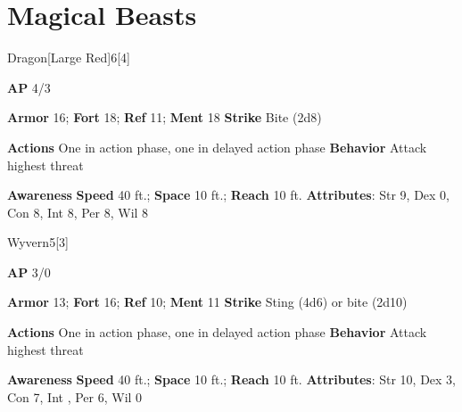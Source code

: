 \section{Magical Beasts}
\begin{monsection}{Dragon}[Large Red]{6}[4]
\vspace{-1em}\vspace{-1em}
\begin{spellcontent}
\begin{spelltargetinginfo}
{\textbf{AP} 4/3}

\pari \textbf{Armor} 16;
\textbf{Fort} 18;
\textbf{Ref} 11;
\textbf{Ment} 18
\pari \textbf{Strike} Bite  (2d8)


\pari \textbf{Actions} One in action phase, one in delayed action phase
\pari \textbf{Behavior} Attack highest threat
\end{spelltargetinginfo}
\end{spellcontent}

\begin{monsterfooter}
\pari \textbf{Awareness} 
\pari \textbf{Speed} 40 ft.;
\textbf{Space} 10 ft.;
\textbf{Reach} 10 ft.
\pari \textbf{Attributes}:
Str 9,
Dex 0,
Con 8,
Int 8,
Per 8,
Wil 8
\end{monsterfooter}
\end{monsection}

\begin{monsection}{Wyvern}{5}[3]
\vspace{-1em}\vspace{-1em}
\begin{spellcontent}
\begin{spelltargetinginfo}
{\textbf{AP} 3/0}

\pari \textbf{Armor} 13;
\textbf{Fort} 16;
\textbf{Ref} 10;
\textbf{Ment} 11
\pari \textbf{Strike} Sting  (4d6) or bite  (2d10)


\pari \textbf{Actions} One in action phase, one in delayed action phase
\pari \textbf{Behavior} Attack highest threat
\end{spelltargetinginfo}
\end{spellcontent}

\begin{monsterfooter}
\pari \textbf{Awareness} 
\pari \textbf{Speed} 40 ft.;
\textbf{Space} 10 ft.;
\textbf{Reach} 10 ft.
\pari \textbf{Attributes}:
Str 10,
Dex 3,
Con 7,
Int ,
Per 6,
Wil 0
\end{monsterfooter}
\end{monsection}

